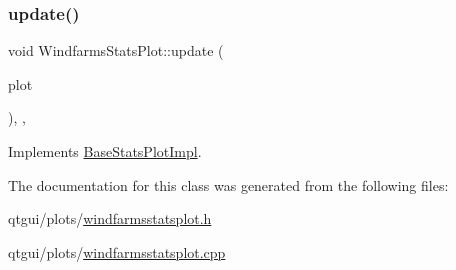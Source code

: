 \mbox{\label{class_windfarms_stats_plot_ac92ec0f10052bb5322de99ddf595468b}} 
\subsubsection{\texorpdfstring{update()}{update()}\hspace{0.1cm}{\footnotesize\ttfamily [2/2]}}
{\footnotesize\ttfamily void Windfarms\+Stats\+Plot\+::update (\begin{DoxyParamCaption}\item[{\mbox{\hyperlink{class_q_custom_plot}{Q\+Custom\+Plot}} $\ast$}]{plot }\end{DoxyParamCaption})\hspace{0.3cm}{\ttfamily [override]}, {\ttfamily [protected]}, {\ttfamily [virtual]}}



Implements \mbox{\hyperlink{class_base_stats_plot_impl_aa483fe8053767302195bb82bf9a3d7fb}{Base\+Stats\+Plot\+Impl}}.



The documentation for this class was generated from the following files\+:\begin{DoxyCompactItemize}
\item 
qtgui/plots/\mbox{\hyperlink{windfarmsstatsplot_8h}{windfarmsstatsplot.\+h}}\item 
qtgui/plots/\mbox{\hyperlink{windfarmsstatsplot_8cpp}{windfarmsstatsplot.\+cpp}}\end{DoxyCompactItemize}

